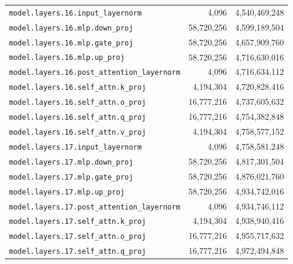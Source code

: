 \documentclass[10pt,a4paper]{article}
\theoremstyle{definition}
\begin{document}
\begin{appendices}
\begin{longtable}{p{9.5cm}rr}
\texttt{model.\allowbreak{}layers.\allowbreak{}16.\allowbreak{}input\_layernorm} & 4,096 & 4,540,469,248 \\
\texttt{model.\allowbreak{}layers.\allowbreak{}16.\allowbreak{}mlp.\allowbreak{}down\_proj} & 58,720,256 & 4,599,189,504 \\
\texttt{model.\allowbreak{}layers.\allowbreak{}16.\allowbreak{}mlp.\allowbreak{}gate\_proj} & 58,720,256 & 4,657,909,760 \\
\texttt{model.\allowbreak{}layers.\allowbreak{}16.\allowbreak{}mlp.\allowbreak{}up\_proj} & 58,720,256 & 4,716,630,016 \\
\texttt{model.\allowbreak{}layers.\allowbreak{}16.\allowbreak{}post\_attention\_layernorm} & 4,096 & 4,716,634,112 \\
\texttt{model.\allowbreak{}layers.\allowbreak{}16.\allowbreak{}self\_attn.\allowbreak{}k\_proj} & 4,194,304 & 4,720,828,416 \\
\texttt{model.\allowbreak{}layers.\allowbreak{}16.\allowbreak{}self\_attn.\allowbreak{}o\_proj} & 16,777,216 & 4,737,605,632 \\
\texttt{model.\allowbreak{}layers.\allowbreak{}16.\allowbreak{}self\_attn.\allowbreak{}q\_proj} & 16,777,216 & 4,754,382,848 \\
\texttt{model.\allowbreak{}layers.\allowbreak{}16.\allowbreak{}self\_attn.\allowbreak{}v\_proj} & 4,194,304 & 4,758,577,152 \\
\texttt{model.\allowbreak{}layers.\allowbreak{}17.\allowbreak{}input\_layernorm} & 4,096 & 4,758,581,248 \\
\texttt{model.\allowbreak{}layers.\allowbreak{}17.\allowbreak{}mlp.\allowbreak{}down\_proj} & 58,720,256 & 4,817,301,504 \\
\texttt{model.\allowbreak{}layers.\allowbreak{}17.\allowbreak{}mlp.\allowbreak{}gate\_proj} & 58,720,256 & 4,876,021,760 \\
\texttt{model.\allowbreak{}layers.\allowbreak{}17.\allowbreak{}mlp.\allowbreak{}up\_proj} & 58,720,256 & 4,934,742,016 \\
\texttt{model.\allowbreak{}layers.\allowbreak{}17.\allowbreak{}post\_attention\_layernorm} & 4,096 & 4,934,746,112 \\
\texttt{model.\allowbreak{}layers.\allowbreak{}17.\allowbreak{}self\_attn.\allowbreak{}k\_proj} & 4,194,304 & 4,938,940,416 \\
\texttt{model.\allowbreak{}layers.\allowbreak{}17.\allowbreak{}self\_attn.\allowbreak{}o\_proj} & 16,777,216 & 4,955,717,632 \\
\texttt{model.\allowbreak{}layers.\allowbreak{}17.\allowbreak{}self\_attn.\allowbreak{}q\_proj} & 16,777,216 & 4,972,494,848 \\

\end{longtable}
\end{appendices}
\end{document}
